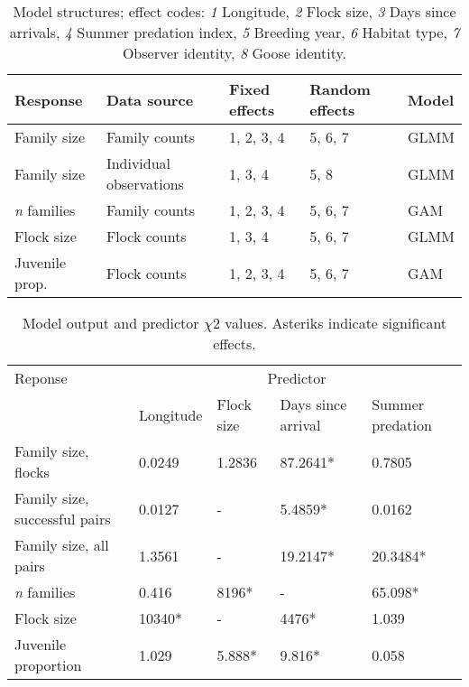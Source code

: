 \begin{table*}
\centering
\begin{tabular}{*5l}\toprule 
Response & Data source & Fixed effects & Random effects & Model\tabularnewline \midrule
Family size & Family counts & 1, 2, 3, 4 & 5, 6, 7 & GLMM\tabularnewline

Family size & Individual observations & 1, 3, 4 & 5, 8 & GLMM\tabularnewline

\emph{n} families & Family counts & 1, 2, 3, 4 & 5, 6, 7 & GAM\tabularnewline

Flock size & Flock counts & 1, 3, 4 & 5, 6, 7 & GLMM\tabularnewline

Juvenile prop. & Flock counts & 1, 2, 3, 4 & 5, 6, 7 & GAM\tabularnewline \bottomrule

\end{tabular}

\caption{Model structures; effect codes: \emph{1} Longitude, \emph{2} Flock size, \emph{3} Days since arrivals, \emph{4} Summer predation index, \emph{5} Breeding year, \emph{6} Habitat type, \emph{7} Observer identity, \emph{8} Goose identity.}

\end{table*}
\centering
\begin{table*}
\begin{tabular}{*5l}\toprule 

Reponse & \multicolumn{4}{c}{Predictor}\tabularnewline
 & Longitude & Flock size & Days since arrival & Summer predation\tabularnewline \midrule
 
Family size, flocks & 0.0249 & 1.2836 & 87.2641{*} & 0.7805\tabularnewline
 
Family size, successful pairs & 0.0127 & - & 5.4859{*} & 0.0162\tabularnewline

Family size, all pairs & 1.3561 & - & 19.2147{*} & 20.3484{*}\tabularnewline
 
\emph{n} families & 0.416 & 8196{*} & - & 65.098{*}\tabularnewline

Flock size & 10340{*} & - & 4476{*} & 1.039\tabularnewline

Juvenile proportion & 1.029 & 5.888{*} & 9.816{*} & 0.058\tabularnewline \bottomrule

\end{tabular}

\caption{Model output and predictor $\chi{2}$ values. Asteriks indicate significant effects.}

\end{table*}